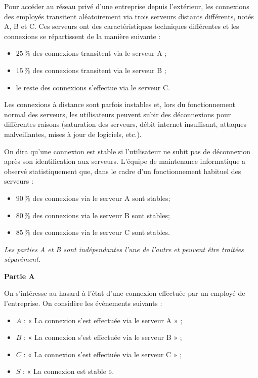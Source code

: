 
Pour accéder au réseau privé d'une entreprise depuis l'extérieur, les connexions des employés transitent aléatoirement via trois serveurs distants différents, notés A, B et C. Ces serveurs ont des caractéristiques techniques différentes et les connexions se répartissent de la manière suivante :

\begin{itemize}
	\item $25\,\%$ des connexions transitent via le serveur A ;
	\item $15\,\%$ des connexions transitent via le serveur B ;
	\item le reste des connexions s'effectue via le serveur C.
\end{itemize}

Les connexions à distance sont parfois instables et, lors du fonctionnement normal des serveurs, les utilisateurs peuvent subir des déconnexions pour différentes raisons (saturation des serveurs, débit internet insuffisant, attaques malveillantes, mises à jour de logiciels, etc.).

\smallskip

On dira qu'une connexion est stable si l'utilisateur ne subit pas de déconnexion après son identification aux serveurs. L'équipe de maintenance informatique a observé statistiquement que, dans le cadre d'un fonctionnement habituel des serveurs :

\begin{itemize}
	\item $90\,\%$ des connexions via le serveur A sont stables;
	\item $80\,\%$ des connexions via le serveur B sont stables;
	\item $85\,\%$ des connexions via le serveur C sont stables.
\end{itemize}

\textit{Les parties A et B sont indépendantes l'une de l'autre et peuvent être traitées séparément.}

\begin{center}
	\textbf{Partie A}
\end{center}

On s'intéresse au hasard à l'état d'une connexion effectuée par un employé de l'entreprise. On considère les événements suivants :

\begin{itemize}
	\item $A$ : « La connexion s'est effectuée via le serveur A » ;
	\item $B$ : « La connexion s'est effectuée via le serveur B » ;
	\item $C$ : « La connexion s'est effectuée via le serveur C » ;
	\item $S$ : « La connexion est stable ».
\end{itemize}

